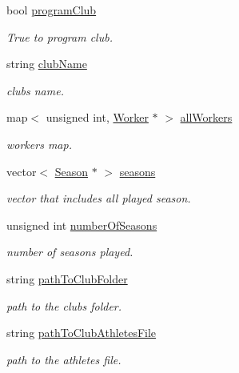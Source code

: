 \begin{DoxyCompactItemize}
\item 
bool \hyperlink{class_club_aff52eace9c0bf641cc73a55b5c062bc4}{program\+Club}
\begin{DoxyCompactList}\small\item\em True to program club. \end{DoxyCompactList}\item 
string \hyperlink{class_club_acd01c6183dc0747ad3c3ab8167bd860e}{club\+Name}
\begin{DoxyCompactList}\small\item\em club\textquotesingle{}s name. \end{DoxyCompactList}\item 
map$<$ unsigned int, \hyperlink{class_worker}{Worker} $\ast$ $>$ \hyperlink{class_club_acbdc0f19e2a14b6e3fe79c92081a0b6e}{all\+Workers}
\begin{DoxyCompactList}\small\item\em workers\textquotesingle{} map. \end{DoxyCompactList}\item 
vector$<$ \hyperlink{class_season}{Season} $\ast$ $>$ \hyperlink{class_club_af94fabc0c00f49220bd959b0ec2bda26}{seasons}
\begin{DoxyCompactList}\small\item\em vector that includes all played season. \end{DoxyCompactList}\item 
unsigned int \hyperlink{class_club_a953a3ef4d0bde6a35ff94f481aba34cb}{number\+Of\+Seasons}
\begin{DoxyCompactList}\small\item\em number of seasons played. \end{DoxyCompactList}\item 
string \hyperlink{class_club_a7c15547fa5dac447cd5a986ae3b4f7c3}{path\+To\+Club\+Folder}
\begin{DoxyCompactList}\small\item\em path to the club\textquotesingle{}s folder. \end{DoxyCompactList}\item 
string \hyperlink{class_club_ad3865f52b2164f79107444b5959ee931}{path\+To\+Club\+Athletes\+File}
\begin{DoxyCompactList}\small\item\em path to the athletes\textquotesingle{} file. \end{DoxyCompactList}\item 

\end{DoxyCompactItemize}
